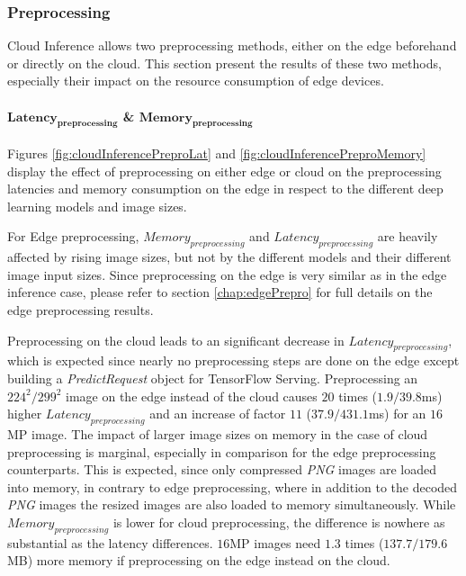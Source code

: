 \subsubsection{Preprocessing}
Cloud Inference allows two preprocessing methods, either on the edge beforehand or directly on the cloud.
This section present the results of these two methods, especially their impact on the resource consumption of edge devices.

\paragraph{$\mathbf{Latency_{preprocessing}}$ \& $\mathbf{Memory_{preprocessing}}$}
Figures \ref{fig:cloudInferencePreproLat} and \ref{fig:cloudInferencePreproMemory} display the effect of preprocessing on either edge or cloud on the preprocessing latencies and memory consumption on the edge in respect to the different deep learning models and image sizes.

For Edge preprocessing, $Memory_{preprocessing}$ and $Latency_{preprocessing}$ are heavily affected by rising image sizes, but not by the different models and their different image input sizes.
Since preprocessing on the edge is very similar as in the edge inference case, please refer to section \ref{chap:edgePrepro} for full details on the edge preprocessing results.

Preprocessing on the cloud leads to an significant decrease in $Latency_{preprocessing}$, which is expected since nearly no preprocessing steps are done on the edge except building a \emph{PredictRequest} object for TensorFlow Serving.
Preprocessing an $224^2/299^2$ image on the edge instead of the cloud causes $20$ times ($1.9/39.8$ms) higher $Latency_{preprocessing}$ and an increase of factor $11$ ($37.9/431.1$ms) for an $16$MP image.
The impact of larger image sizes on memory in the case of cloud preprocessing is marginal, especially in comparison for the edge preprocessing counterparts. This is expected, since only compressed \emph{PNG} images are loaded into memory, in contrary to edge preprocessing, where in addition to the decoded \emph{PNG} images the resized images are also loaded to memory simultaneously.
While $Memory_{preprocessing}$ is lower for cloud preprocessing, the difference is nowhere as substantial as the latency differences. $16$MP images need $1.3$ times ($137.7/179.6$MB) more memory if preprocessing on the edge instead on the cloud.

